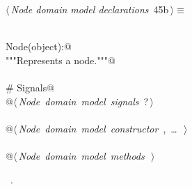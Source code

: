 \documentclass[
    a4paper,      %
    10pt,         %
    openright,    %
    notitlepage,  %
    parskip=half, %
]{scrreprt}       %
\theoremstyle{definition}                    %
\begin{document}
\begin{flushleft} \small
\begin{minipage}{\linewidth}\label{scrap57}\raggedright\small
{} $\langle\,${\itshape Node domain model declarations}\nobreak\ {\footnotesize {45b}}$\,\rangle\equiv$
\vspace{-1exm}
\begin{list}{}{} \item
\mbox{}\lstinline@@\\
\mbox{}\lstinline@class Node(object):@\\
\mbox{}\lstinline@    """Represents a node."""@\\
\mbox{}\lstinline@@\\
\mbox{}\lstinline@    # Signals@\\
\mbox{}\lstinline@    @\hbox{$\langle\,${\itshape Node domain model signals}\nobreak\ {\footnotesize ?}$\,\rangle$}\lstinline@@\\
\mbox{}\lstinline@@\\
\mbox{}\lstinline@    @\hbox{$\langle\,${\itshape Node domain model constructor}\nobreak\ {\footnotesize {}, \ldots\ }$\,\rangle$}\lstinline@@\\
\mbox{}\lstinline@@\\
\mbox{}\lstinline@    @\hbox{$\langle\,${\itshape Node domain model methods}\nobreak\ {\footnotesize {}}$\,\rangle$}\lstinline@@\\
\mbox{}\lstinline@@{\NWsep}
\end{list}
\vspace{-1.5ex}
\footnotesize
\begin{list}{}{\setlength{\itemsep}{-\parsep}\setlength{\itemindent}{-\leftmargin}}
\item \NWtxtMacroRefIn\ .

\item{}
\end{list}
\end{minipage}\vspace{4ex}
\end{flushleft}
\end{document}
